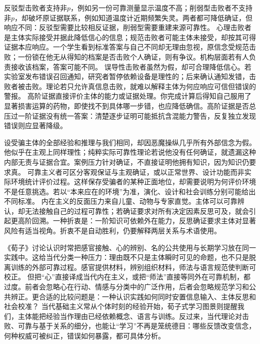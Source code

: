 反驳型击败者支持非$p$，例如另一份可靠测量显示温度不高；削弱型击败者不支持非$p$，却破坏原证据联系，例如知道温度计近期频繁失灵。两者都可降低确证，但响应不同：反驳型需要比较相反证据，削弱型需要重建来源可靠性。 心理击败者是主体实际接受并据此降低信心的信息；规范击败者可能主体未接受，却按其可得证据本应响应。一个学生看到标准答案与自己不同却无理由忽视，原信念受规范击败；一份锁在他无从得知的档案是否击败个人确证，则有争议。机构层面若有人负责接收该档案，答案可能不同。 误导性击败者虽然为假，却可合理降低信心。若实验室发布错误召回通知，研究者暂停依赖设备是理性的；后来确认通知发错，击败者被击败。理论若只允许真信息击败，就难以解释主体为何应响应可信但错误的警报。 高阶证据直接评价主体的能力或证据处理。你完成计算后得知自己服用了显著损害运算的药物，即使找不到具体哪一步错，也应降低确信。高阶证据是否总压过一阶证据没有统一答案：清楚逐步证明可能抵抗含混能力警告，反复独立发现错误则应显著降级。

设受骗主体的全部经验和推理与我们相同，却因恶魔操纵几乎所有外部信念为假。他似乎在主观上同样理性；纯粹实际可靠性理论若说他没有任何确证，就遗漏这种内部无责与证据合宜。案例压力针对确证，不直接证明他拥有知识，因为知识仍要求真。 可靠主义者可区分客观保证与主观确证，或以正常世界、设计功能而非实际环境统计评价过程。这样保存受骗者的某种正面地位，却需要说明为何评价环境不是任意挑选。若以“本来应在的环境”为准，演化、设计和社会训练分别可能给出不同标准。 内在主义的反面压力来自儿童、动物与专家直觉。主体可以可靠辨认，却无法接触自己的过程可靠性；若确证要求对所有决定因素反思可及，就会引起更高阶回溯。一种折衷是：一阶知识可依赖外在能力，反思确证要求主体对显著风险有适当视角。折衷不是自动胜利，仍要解释两层关系与术语使用。

《荀子》讨论认识时常把感官接触、心的辨别、名的公共使用与长期学习放在同一实践中\parencite{xunzi2014}。这给当代分类一种压力：理由既不只是主体瞬时可见的命题，也不只是脱离训练的外部可靠过程。感官提供材料，辨别组织材料，师法与语言规范使判断可校正。 但把“心”直接译成当代内在主义，或把“师法”直接等同外在可靠机制，都过度。前者会忽略心在行动、情感与分类中的广泛作用，后者会忽略规范学习和公共辨正。更合适的比较问题是：一种认识实践如何同时安置信息输入、主体反思和社会校准？ 当代基础主义常从个体时刻的经验开始，荀子式学习图景则提醒我们，主体能把经验当作理由已经依赖概念、语言与训练。反过来，当代理论对击败、可靠与基于关系的细分，也能让“学习”不再是笼统德目：哪些反馈改变信念，何种权威可被纠正，错误如何暴露，都可具体分析。

